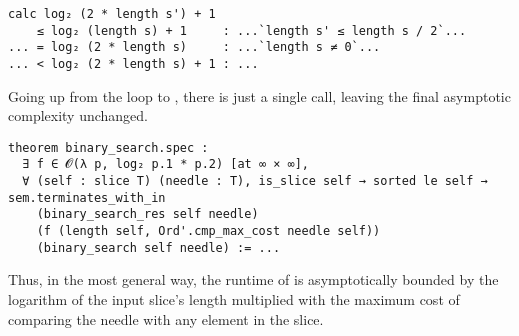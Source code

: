 \begin{verbatim}
calc log₂ (2 * length s') + 1
    ≤ log₂ (length s) + 1     : ...`length s' ≤ length s / 2`...
... = log₂ (2 * length s)     : ...`length s ≠ 0`...
... < log₂ (2 * length s) + 1 : ...
\end{verbatim}

Going up from the loop to , there is just a single call, leaving
the final asymptotic complexity unchanged.

\begin{verbatim}
theorem binary_search.spec :
  ∃ f ∈ 𝓞(λ p, log₂ p.1 * p.2) [at ∞ × ∞],
  ∀ (self : slice T) (needle : T), is_slice self → sorted le self → sem.terminates_with_in
    (binary_search_res self needle)
    (f (length self, Ord'.cmp_max_cost needle self))
    (binary_search self needle) := ...
\end{verbatim}

Thus, in the most general way, the runtime of  is
asymptotically bounded by the logarithm of the input slice's length multiplied
with the maximum cost of comparing the needle with any element in the slice.